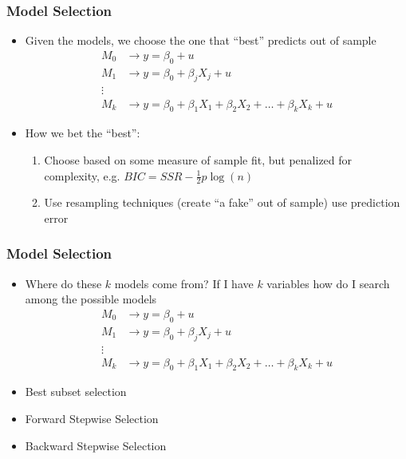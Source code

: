 \documentclass[
  shownotes,
  xcolor={svgnames},
  hyperref={colorlinks,citecolor=DarkBlue,linkcolor=DarkRed,urlcolor=DarkBlue}
  , aspectratio=169]{beamer}
\begin{document}
\begin{frame}[fragile]
\frametitle{Model Selection}

\begin{itemize}
\item Given the models, we choose the one that ``best'' predicts out of sample
\medskip
\begin{align}
  M_0 &\rightarrow y= \beta_0  + u  \\ 
  M_1 &\rightarrow y= \beta_0  + \beta_j X_j +u \\
  \vdots \\
  M_k &\rightarrow y= \beta_0   + \beta_1 X_1 + \beta_2 X_2 + \dots + \beta_k X_k +u 
  \end{align}
  \medskip

  \item How we bet the ``best'': 
  \medskip
\begin{enumerate}
  \item Choose based on some measure of sample fit, but penalized for complexity, e.g. $BIC=SSR - \frac{1}{2}p \log(n)$
  \medskip
  \item Use resampling techniques (create ``a fake'' out of sample) use prediction error
\end{enumerate}


\end{itemize}

\end{frame}
\begin{frame}[fragile]
\frametitle{Model Selection}

\begin{itemize}
\item Where do these $k$ models come from? If I have $k$ variables how do I search among the possible models
\medskip
\begin{align}
  M_0 &\rightarrow y= \beta_0  + u  \\ 
  M_1 &\rightarrow y= \beta_0  + \beta_j X_j +u \\
  \vdots \\
  M_k &\rightarrow y= \beta_0   + \beta_1 X_1 + \beta_2 X_2 + \dots + \beta_k X_k +u 
  \end{align}
\medskip 

\item  Best subset selection
\medskip 
\item Forward  Stepwise Selection
\medskip 
\item Backward Stepwise Selection
\end{itemize}
\end{frame}
\end{document}
